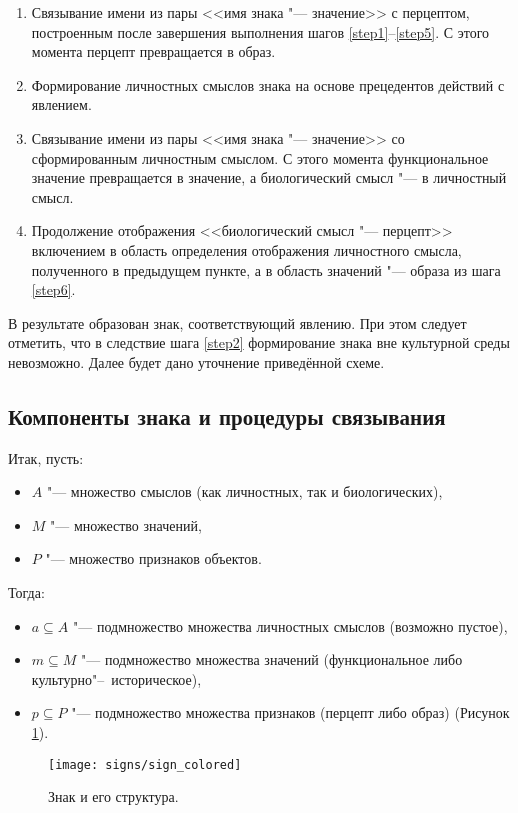 \begin{enumerate}
	\item\label{step6} Связывание имени из пары <<имя знака "--- значение>> с перцептом, построенным после завершения выполнения шагов \ref{step1}--\ref{step5}. С этого момента перцепт превращается в образ.
	\item Формирование личностных смыслов знака на основе прецедентов действий с явлением.
	\item Связывание имени из пары <<имя знака "--- значение>> со сформированным личностным смыслом. С этого момента функциональное значение превращается в значение, а биологический смысл "--- в личностный смысл.
	\item Продолжение отображения <<биологический смысл "--- перцепт>> включением в область определения отображения личностного смысла, полученного в предыдущем пункте, а в область значений "--- образа из шага \ref{step6}.
\end{enumerate}

В результате образован знак, соответствующий явлению. При этом следует отметить, что в следствие шага \ref{step2} формирование знака вне культурной среды невозможно. Далее будет дано уточнение приведённой схеме.

\subsection{Компоненты знака и процедуры связывания}\label{subsect2_2_1}

Итак, пусть:
\begin{itemize}
	\item $A$ "--- множество смыслов (как личностных, так и биологических),
	\item $M$ "--- множество значений,
	\item $P$ "--- множество признаков объектов.
\end{itemize}

Тогда:
\begin{itemize}
	\item $a\subseteq A$ "--- подмножество множества личностных смыслов (возможно пустое),
	\item $m\subseteq M$ "--- подмножество множества значений (функциональное либо культурно"--~историческое),
	\item $p\subseteq P$ "--- подмножество множества признаков (перцепт либо образ) (Рисунок \ref{fg:sign}).
\end{itemize}

\begin{figure}[h]
	\centering
	\texttt{[image: signs/sign\_colored]}
	\caption{Знак и его структура.}
	\label{fg:sign}
\end{figure}

